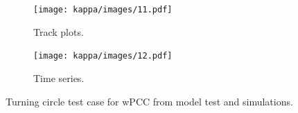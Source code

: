 \begin{figure}[h]
    \centering

    \begin{subfigure}[b]{\textwidth}
        \texttt{[image: kappa/images/11.pdf]}
        \caption{Track plots.}\label{fig:track-plot-testing-sim}
    \end{subfigure}
    \vfill
    \begin{subfigure}[b]{\textwidth}
        \texttt{[image: kappa/images/12.pdf]}
        \caption{Time series.}\label{\detokenize{06.10_results_wpcc:fig-testing-sim}}
    \end{subfigure}
        
    \caption{Turning circle test case for wPCC from model test and simulations.}
    \label{fig:enter-label}
\end{figure}

\FloatBarrier

